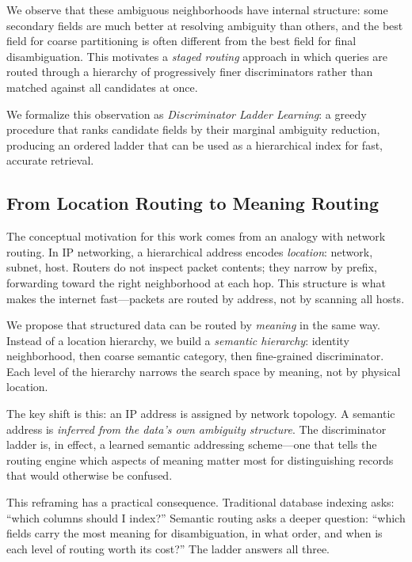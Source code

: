 \documentclass[11pt]{article}
\begin{document}
We observe that these ambiguous neighborhoods have internal structure: some secondary fields are much better at resolving ambiguity than others, and the best field for coarse partitioning is often different from the best field for final disambiguation. This motivates a \textit{staged routing} approach in which queries are routed through a hierarchy of progressively finer discriminators rather than matched against all candidates at once.

We formalize this observation as \textit{Discriminator Ladder Learning}: a greedy procedure that ranks candidate fields by their marginal ambiguity reduction, producing an ordered ladder that can be used as a hierarchical index for fast, accurate retrieval.

\subsection{From Location Routing to Meaning Routing}

The conceptual motivation for this work comes from an analogy with network routing. In IP networking, a hierarchical address encodes \textit{location}: network, subnet, host. Routers do not inspect packet contents; they narrow by prefix, forwarding toward the right neighborhood at each hop. This structure is what makes the internet fast---packets are routed by address, not by scanning all hosts.

We propose that structured data can be routed by \textit{meaning} in the same way. Instead of a location hierarchy, we build a \textit{semantic hierarchy}: identity neighborhood, then coarse semantic category, then fine-grained discriminator. Each level of the hierarchy narrows the search space by meaning, not by physical location.

The key shift is this: an IP address is assigned by network topology. A semantic address is \textit{inferred from the data's own ambiguity structure}. The discriminator ladder is, in effect, a learned semantic addressing scheme---one that tells the routing engine which aspects of meaning matter most for distinguishing records that would otherwise be confused.

This reframing has a practical consequence. Traditional database indexing asks: ``which columns should I index?'' Semantic routing asks a deeper question: ``which fields carry the most meaning for disambiguation, in what order, and when is each level of routing worth its cost?'' The ladder answers all three.
\end{document}
